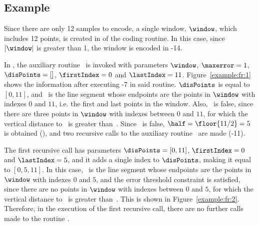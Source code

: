 \vspace{+10pt}





\clearpage
\subsection{Example}
\label{algo:fr:example}


\exampleIntro{\ref{example:fr:1}}


Since there are only 12 samples to encode, a single window, $\window$, which includes 12 points, is created in  of the coding routine. In this case, since $|\window|$ is greater than 1, the window is encoded in -14. 


In , the auxiliary routine \getDisplacedPointsMethod\ is invoked with parameters $\window$, $\maxerror=1$, $\disPoints=[]$, $\firstIndex = 0$ and $\lastIndex = 11$. Figure~\ref{example:fr:1} shows the information after executing -7 in said routine. $\disPoints$ is equal to $[0, 11]$, and \segment\ is the line segment whose endpoints are the points in $\window$ with indexes $0$ and $11$, i.e. the first and last points in the window. Also, \validSegment\ is false, since there are three points in $\window$ with indexes between $0$ and $11$, for which the vertical distance to \segment\ is greater than~\maxerror. Since \validSegment\ is false, $\half=\floor{11/2}=5$ is obtained (), and two recursive calls to the auxiliary routine \getDisplacedPointsMethod\ are made (-11).




The first recursive call has parameters $\disPoints=[0, 11]$, $\firstIndex = 0$ and $\lastIndex = 5$, and it adds a single index to $\disPoints$, making it equal to $[0, 5, 11]$. In this case, \segment\ is the line segment whose endpoints are the points in $\window$ with indexes $0$ and $5$, and the error threshold constraint is satisfied, since there are no points in $\window$ with indexes between $0$ and $5$, for which the vertical distance to \segment\ is greater than~\maxerror. This is shown in Figure~\ref{example:fr:2}. Therefore, in the execution of the first recursive call, there are no further calls made to the routine \getDisplacedPointsMethod.


